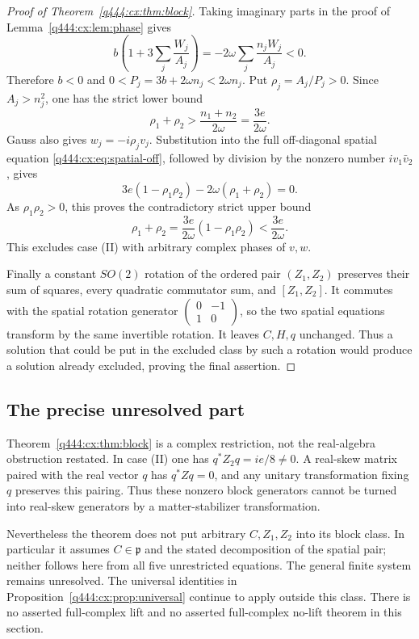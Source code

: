 \begin{proof}[Proof of Theorem~\ref{q444:cx:thm:block}]
Taking imaginary parts in the proof of Lemma~\ref{q444:cx:lem:phase} gives
\[
 b\left(1+3\sum_j\frac{W_j}{A_j}\right)
       =-2\omega\sum_j\frac{n_jW_j}{A_j}<0.
\]
Therefore $b<0$ and $0<P_j=3b+2\omega n_j<2\omega n_j$.
Put $\rho_j=A_j/P_j>0$. Since $A_j>n_j^2$, one has the strict lower bound
\begin{equation}\label{q444:cx:eq:lower-rho}
 \rho_1+\rho_2>
 \frac{n_1+n_2}{2\omega}=\frac{3e}{2\omega}.
\end{equation}
Gauss also gives $w_j=-i\rho_jv_j$.
Substitution into the full off-diagonal spatial equation
\eqref{q444:cx:eq:spatial-off}, followed by division by the nonzero number
$iv_1\bar v_2$, gives
\[
 3e(1-\rho_1\rho_2)-2\omega(\rho_1+\rho_2)=0.
\]
As $\rho_1\rho_2>0$, this proves the contradictory strict upper bound
\[
 \rho_1+\rho_2=
       \frac{3e}{2\omega}(1-\rho_1\rho_2)<\frac{3e}{2\omega}.
\]
This excludes case (II) with arbitrary complex phases of $v,w$.

Finally a constant $SO(2)$ rotation of the ordered pair $(Z_1,Z_2)$
preserves their sum of squares, every quadratic commutator sum, and
$[Z_1,Z_2]$. It commutes with the spatial rotation generator
$\left(\begin{smallmatrix}0&-1\\1&0\end{smallmatrix}\right)$,
so the two spatial equations transform by the same invertible rotation.
It leaves $C,H,q$ unchanged. Thus a solution that could be put in the
excluded class by such a rotation would produce a solution already
excluded, proving the final assertion.
\end{proof}

\subsection{The precise unresolved part}

Theorem~\ref{q444:cx:thm:block} is a complex restriction, not the real-algebra
obstruction restated. In case (II) one has
$q^*Z_2q=ie/8\ne0$. A real-skew matrix paired with the real vector $q$
has $q^*Zq=0$, and any unitary transformation fixing $q$ preserves this
pairing. Thus these nonzero block generators cannot be turned into
real-skew generators by a matter-stabilizer transformation.

Nevertheless the theorem does not put arbitrary $C,Z_1,Z_2$ into its
block class. In particular it assumes $C\in\mathfrak p$ and the stated
decomposition of the spatial pair; neither follows here from all five
unrestricted equations. The general finite system remains unresolved.
The universal identities in Proposition~\ref{q444:cx:prop:universal} continue to
apply outside this class. There is no asserted full-complex lift and no
asserted full-complex no-lift theorem in this section.

